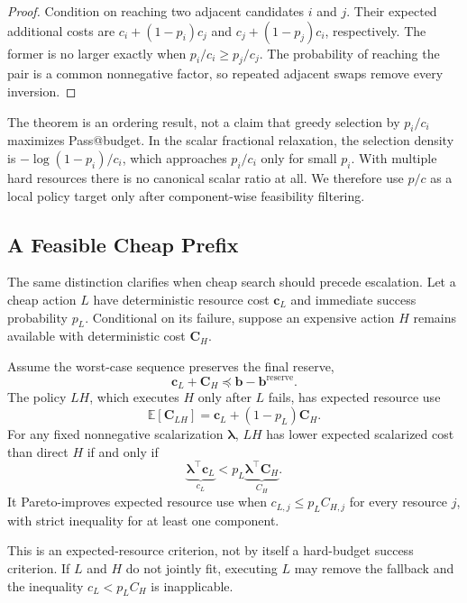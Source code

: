 \begin{proof}
Condition on reaching two adjacent candidates \(i\) and \(j\). Their expected
additional costs are \(c_i+(1-p_i)c_j\) and
\(c_j+(1-p_j)c_i\), respectively. The former is no larger exactly when
\(p_i/c_i\ge p_j/c_j\). The probability of reaching the pair is a common
nonnegative factor, so repeated adjacent swaps remove every inversion.
\end{proof}

The theorem is an ordering result, not a claim that greedy selection by
\(p_i/c_i\) maximizes Pass@budget. In the scalar fractional relaxation, the
selection density is \(-\log(1-p_i)/c_i\), which approaches \(p_i/c_i\) only
for small \(p_i\). With multiple hard resources there is no canonical scalar
ratio at all. We therefore use \(p/c\) as a local policy target only after
component-wise feasibility filtering.

\subsection{A Feasible Cheap Prefix}

The same distinction clarifies when cheap search should precede escalation.
Let a cheap action \(L\) have deterministic resource cost \(\mathbf c_L\) and
immediate success probability \(p_L\). Conditional on its failure, suppose an
expensive action \(H\) remains available with deterministic cost
\(\mathbf C_H\).

\begin{proposition}
Assume the worst-case sequence preserves the final reserve,
\[
  \mathbf c_L+\mathbf C_H
  \preceq
  \mathbf b-\mathbf b^{\mathrm{reserve}}.
\]
The policy \(LH\), which executes \(H\) only after \(L\) fails, has expected
resource use
\[
  \mathbb E[\mathbf C_{LH}]
  =\mathbf c_L+(1-p_L)\mathbf C_H.
\]
For any fixed nonnegative scalarization \(\boldsymbol\lambda\), \(LH\) has
lower expected scalarized cost than direct \(H\) if and only if
\[
  \underbrace{\boldsymbol\lambda^\top\mathbf c_L}_{c_L}
  <
  p_L\underbrace{\boldsymbol\lambda^\top\mathbf C_H}_{C_H}.
\]
It Pareto-improves expected resource use when
\(c_{L,j}\le p_L C_{H,j}\) for every resource \(j\), with strict inequality
for at least one component.
\end{proposition}

This is an expected-resource criterion, not by itself a hard-budget success
criterion. If \(L\) and \(H\) do not jointly fit, executing \(L\) may remove the
fallback and the inequality \(c_L<p_LC_H\) is inapplicable.


